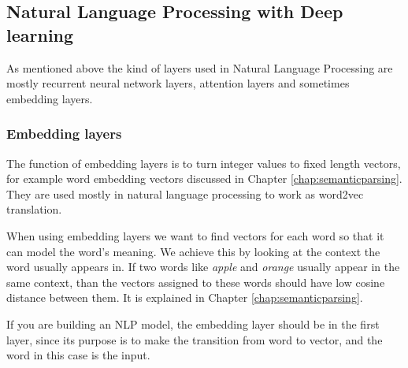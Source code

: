 \subsection{Natural Language Processing with Deep learning}
As mentioned above the kind of layers used in Natural Language Processing are mostly recurrent neural network layers, attention layers and sometimes embedding layers.

\subsubsection{Embedding layers}

The function of embedding layers is to turn integer values to fixed length vectors, for example word embedding vectors discussed in Chapter \ref{chap:semanticparsing}. They are used mostly in natural language processing to work as word2vec translation.

When using embedding layers we want to find vectors for each word so that it can model the word's meaning. We achieve this by looking at the context the word usually appears in. If two words like \textit{apple} and \textit{orange} usually appear in the same context, than the vectors assigned to these words should have low cosine distance between them. It is explained in Chapter \ref{chap:semanticparsing}.

If you are building an NLP model, the embedding layer should be in the first layer, since its purpose is to make the transition from word to vector, and the word in this case is the input.

